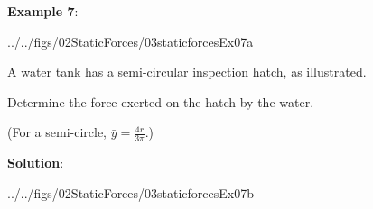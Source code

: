 \documentclass[10pt,onesided]{amsart}
\begin{document}
\begin{minipage}[t]{0.45\textwidth}
	\textbf{Example 7}:\\
	\begin{cfig}[0.35]{../../figs/02StaticForces/03staticforcesEx07a}\end{cfig}
	\raggedright
	A water tank has a semi-circular inspection hatch, as illustrated.
	\par\smallskip
	Determine the force exerted on the hatch by the water. \par
	\begin{center}
		(For a semi-circle, $\bar{y}=\frac{4r}{3\pi}$.)
	\end{center}
\end{minipage}
\hfill
\begin{minipage}[t]{0.5\textwidth}
	\textbf{Solution}:
	\par\bigskip
	\cbox[0.9]{
		\Large
		\[\bar{y} = \frac{4(600\,\text{mm})}{3\pi} = 254.65\,\text{mm}\]
	}
	\par\bigskip
	\begin{cfig}[0.5]{../../figs/02StaticForces/03staticforcesEx07b}\end{cfig}
	\par\bigskip
\end{minipage}
\end{document}
